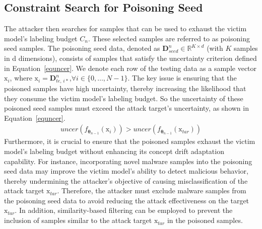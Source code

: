 \subsection{Constraint Search for Poisoning Seed}
The attacker then searches for samples that can be used to exhaust the victim model’s labeling budget $C_{n}$.
These selected samples are referred to as poisoning seed samples.
The poisoning seed data, denoted as $\bm{D}_{seed}^{n} \in \mathbb{R}^{K \times d}$ (with $K$ samples in d dimensions), consists of samples that satisfy the uncertainty criterion defined in Equation~\ref{equncer}.
We denote each row of the testing data as a sample vector $\bm{\mathrm{x}}_{i}$, where $\bm{\mathrm{x}}_{i} = \bm{D}_{te,\,i*}^{n}$,$\forall i \in \{0, \dots, N-1\}$.
The key issue is ensuring that the poisoned samples have high uncertainty, thereby increasing the likelihood that they consume the victim model's labeling budget.
So the uncertainty of these poisoned seed samples must exceed the attack target’s uncertainty, as shown in Equation~\ref{equncer}.
\begin{equation}
	\begin{aligned}
		uncer(f_{\bm{\theta}_{n-1}} \left( \bm{\mathrm{x}}_{i} \right)) > uncer(f_{\bm{\theta}_{n-1}} \left( \bm{\mathrm{x}}_{tar} \right))
	\end{aligned}
	\label{equncer}
\end{equation}
Furthermore, it is crucial to ensure that the poisoned samples exhaust the victim model’s labeling budget without enhancing its concept drift adaptation capability.
For instance, incorporating novel malware samples into the poisoning seed data may improve the victim model’s ability to detect malicious behavior, thereby undermining the attacker’s objective of causing misclassification of the attack target $\bm{\mathrm{x}}_{tar}$.
Therefore, the attacker must exclude malware samples from the poisoning seed data to avoid reducing the attack effectiveness on the target $\bm{\mathrm{x}}_{tar}$.
In addition, similarity-based filtering can be employed to prevent the inclusion of samples similar to the attack target $\bm{\mathrm{x}}_{tar}$ in the poisoned samples.

